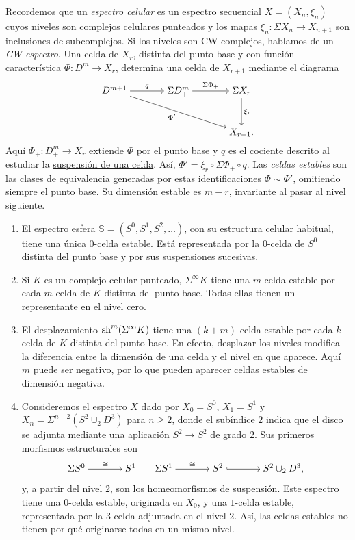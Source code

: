 Recordemos que un \emph{espectro celular} es un espectro secuencial $X=(X_n,\xi_n)$ cuyos niveles son complejos celulares punteados y los mapas $\xi_n\colon\Sigma X_n\to X_{n+1}$ son inclusiones de subcomplejos. Si los niveles son CW complejos, hablamos de un \emph{CW espectro}. Una celda de $X_r$, distinta del punto base y con función característica $\Phi\colon D^m\to X_r$, determina una celda de $X_{r+1}$ mediante el diagrama
\[
\begin{tikzcd}[cramped,column sep=large,row sep=large]
D^{m+1} \arrow[r,"q"] \arrow[drr,"\Phi'"']
& \Sigma D^m_+ \arrow[r,"\Sigma\Phi_+"]
& \Sigma X_r \arrow[d,"\xi_r"]\\
&& X_{r+1}.
\end{tikzcd}
\]
Aquí $\Phi_+\colon D^m_+\to X_r$ extiende $\Phi$ por el punto base y $q$ es el cociente descrito al estudiar la \hyperref[nota:c10-suspension-celda]{suspensión de una celda}. Así, $\Phi'=\xi_r\circ\Sigma\Phi_+\circ q$. Las \emph{celdas estables} son las clases de equivalencia generadas por estas identificaciones $\Phi\sim\Phi'$, omitiendo siempre el punto base. Su dimensión estable es $m-r$, invariante al pasar al nivel siguiente.

\begin{enumerate}
\item El espectro esfera $\mathbb S=(S^0,S^1,S^2,\ldots)$, con su estructura celular habitual, tiene una única $0$-celda estable. Está representada por la $0$-celda de $S^0$ distinta del punto base y por sus suspensiones sucesivas.
\item Si $K$ es un complejo celular punteado, $\Sigma^\infty K$ tiene una $m$-celda estable por cada $m$-celda de $K$ distinta del punto base. Todas ellas tienen un representante en el nivel cero.
\item El desplazamiento $\operatorname{sh}^m(\Sigma^\infty K)$ tiene una $(k+m)$-celda estable por cada $k$-celda de $K$ distinta del punto base. En efecto, desplazar los niveles modifica la diferencia entre la dimensión de una celda y el nivel en que aparece. Aquí $m$ puede ser negativo, por lo que pueden aparecer celdas estables de dimensión negativa.
\item Consideremos el espectro $X$ dado por $X_0=S^0$, $X_1=S^1$ y $X_n=\Sigma^{n-2}(S^2\cup_2D^3)$ para $n\ge2$, donde el subíndice $2$ indica que el disco se adjunta mediante una aplicación $S^2\to S^2$ de grado $2$. Sus primeros morfismos estructurales son
\[
\begin{tikzcd}[cramped,column sep=large]
\Sigma S^0 \arrow[r,"\cong"] & S^1
\end{tikzcd}
\qquad
\begin{tikzcd}[cramped,column sep=large]
\Sigma S^1 \arrow[r,"\cong"] & S^2 \arrow[r,hook] & S^2\cup_2D^3,
\end{tikzcd}
\]
y, a partir del nivel $2$, son los homeomorfismos de suspensión. Este espectro tiene una $0$-celda estable, originada en $X_0$, y una $1$-celda estable, representada por la $3$-celda adjuntada en el nivel $2$. Así, las celdas estables no tienen por qué originarse todas en un mismo nivel.
\end{enumerate}

